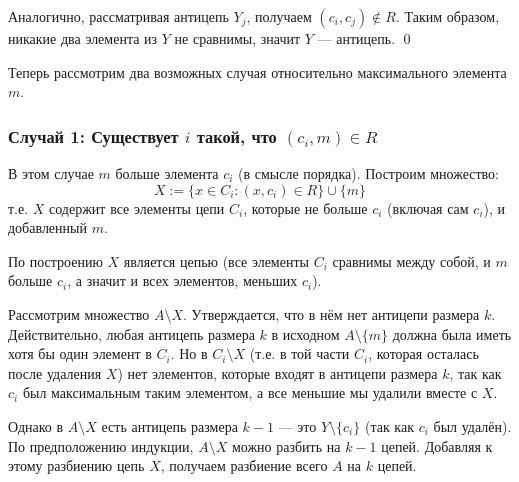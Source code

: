 \documentclass[a4paper,12pt]{article}
\begin{document}
	Аналогично, рассматривая антицепь $Y_j$, получаем $(c_i, c_j) \notin R$. Таким образом, никакие два элемента из $Y$ не сравнимы, значит $Y$ — антицепь. \qed
	
	Теперь рассмотрим два возможных случая относительно максимального элемента $m$.
	
	\subsubsection{Случай 1: Существует $i$ такой, что $(c_i, m) \in R$}
	
	В этом случае $m$ больше элемента $c_i$ (в смысле порядка). Построим множество:
	\[ X := \{x \in C_i : (x, c_i) \in R\} \cup \{m\} \]
	т.е. $X$ содержит все элементы цепи $C_i$, которые не больше $c_i$ (включая сам $c_i$), и добавленный $m$.
	
	\begin{center}
	\end{center}
	
	По построению $X$ является цепью (все элементы $C_i$ сравнимы между собой, и $m$ больше $c_i$, а значит и всех элементов, меньших $c_i$).
	
	Рассмотрим множество $A \setminus X$. Утверждается, что в нём нет антицепи размера $k$. Действительно, любая антицепь размера $k$ в исходном $A \setminus \{m\}$ должна была иметь хотя бы один элемент в $C_i$. Но в $C_i \setminus X$ (т.е. в той части $C_i$, которая осталась после удаления $X$) нет элементов, которые входят в антицепи размера $k$, так как $c_i$ был максимальным таким элементом, а все меньшие мы удалили вместе с $X$.
	
	Однако в $A \setminus X$ есть антицепь размера $k-1$ — это $Y \setminus \{c_i\}$ (так как $c_i$ был удалён). По предположению индукции, $A \setminus X$ можно разбить на $k-1$ цепей. Добавляя к этому разбиению цепь $X$, получаем разбиение всего $A$ на $k$ цепей.
	
\end{document}
